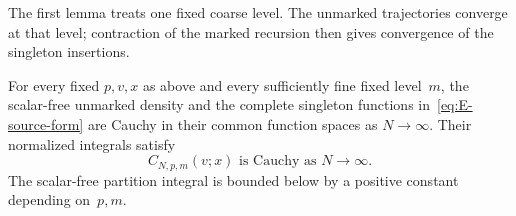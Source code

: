 The first lemma treats one fixed coarse level. The unmarked trajectories converge at that level; contraction of the marked recursion then gives convergence of the singleton insertions.
\begin{lemma}\label{lem:E-fixed-level}
For every fixed $p,v,x$ as above and every sufficiently fine fixed level~$m$, the scalar-free unmarked density and the complete singleton functions in~\eqref{eq:E-source-form} are Cauchy in their common function spaces as $N\to\infty$. Their normalized integrals satisfy
\begin{equation}\label{eq:E-coarse-cauchy}
 C_{N,p,m}(v;x)\text{ is Cauchy as }N\to\infty.
\end{equation}
The scalar-free partition integral is bounded below by a positive constant depending on~$p,m$.
\end{lemma}
